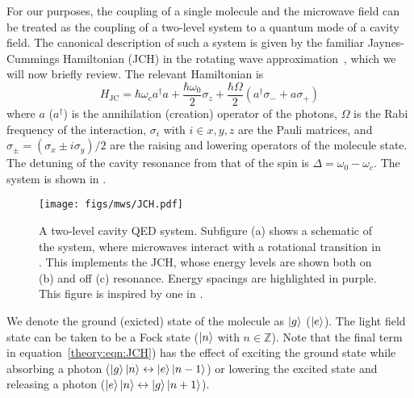 For our purposes, the coupling of a single molecule and the microwave field can
be treated as the coupling of a two-level system to a quantum mode of a cavity
field. The canonical description of such a system is given by the familiar
Jaynes-Cummings Hamiltonian (JCH) in the rotating wave
approximation~\cite{gerry_knight_2004}, which we will now briefly review. The
relevant Hamiltonian is
%
\begin{equation}
  H_\text{JC} = \hbar\omega_c a^\dagger a + \frac{\hbar \omega_0}{2} \sigma_z +
  \frac{\hbar\Omega}{2}(a^\dagger \sigma_- + a\sigma_+)
  \label{theory:eqn:JCH}
\end{equation}
%
where $a$ ($a^\dagger$) is the annihilation (creation) operator of the photons,
$\Omega$ is the Rabi frequency of the interaction, $\sigma_i$ with $i\in{x, y,
z}$ are the Pauli matrices, and $\sigma_\pm = (\sigma_x \pm i\sigma_y)/2$ are
the raising and lowering operators of the molecule state. The detuning of the
cavity resonance from that of the spin is $\Delta = \omega_0 - \omega_c$. The
system is shown in .

\begin{figure}
  \texttt{[image: figs/mws/JCH.pdf]}
  \caption[Two-lvel cavity QED system]{
    A two-level cavity QED system. Subfigure (a) shows a schematic of
    the system, where microwaves interact with a rotational transition in
    \CaF{}. This implements the JCH, whose energy levels are shown both on (b)
    and off (c) resonance. Energy spacings are highlighted in purple. This
    figure is inspired by one in .
  }
  \label{theory:fig:JCHstates}
\end{figure}

We denote the ground (exicted) state of the molecule as $\ket{g}$ ($\ket{e}$).
The light field state can be taken to be a Fock state ($\ket{n}$ with $n \in
\mathbb{Z}$). Note that the final term in equation~\ref{theory:eqn:JCH}) has
the effect of exciting the ground state while absorbing a photon
($\ket{g}\ket{n} \leftrightarrow \ket{e}\ket{n-1}$) or lowering the excited state
and releasing a photon ($\ket{e}\ket{n} \leftrightarrow \ket{g}\ket{n+1}$).

